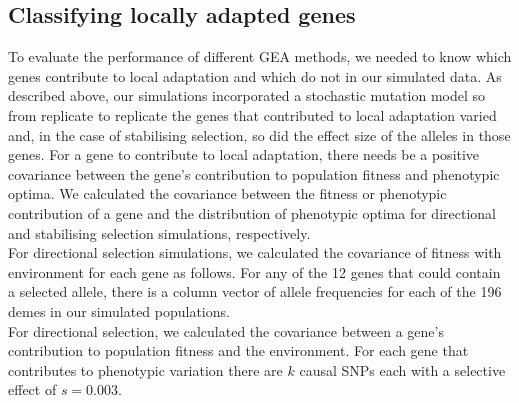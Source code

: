 \documentclass[11pt,twoside,lineno]{GSA_format}
\newcommand{\bm}[1]{\mbox{\boldmath{$#1$}}}
\begin{document}
\subsection{Classifying locally adapted genes} 

To evaluate the performance of different GEA methods, we needed to know which genes contribute to local adaptation and which do not in our simulated data. As described above, our simulations incorporated a stochastic mutation model so from replicate to replicate the genes that contributed to local adaptation varied and, in the case of stabilising selection, so did the effect size of the alleles in those genes. For a gene to contribute to local adaptation, there needs be a positive covariance between the gene's contribution to population fitness and phenotypic optima. We calculated the covariance between the fitness or phenotypic contribution of a gene and the distribution of phenotypic optima for directional and stabilising selection simulations, respectively. \\

For directional selection simulations, we calculated the covariance of fitness with environment for each gene as follows. For any of the 12 genes that could contain a selected allele, there is a column vector of allele frequencies for each of the 196 demes in our simulated populations. \\

For directional selection, we calculated the covariance between a gene's contribution to population fitness and the environment. For each gene that contributes to phenotypic variation there are $k$ causal SNPs each with a selective effect of $s = 0.003$. \\


\end{document}
